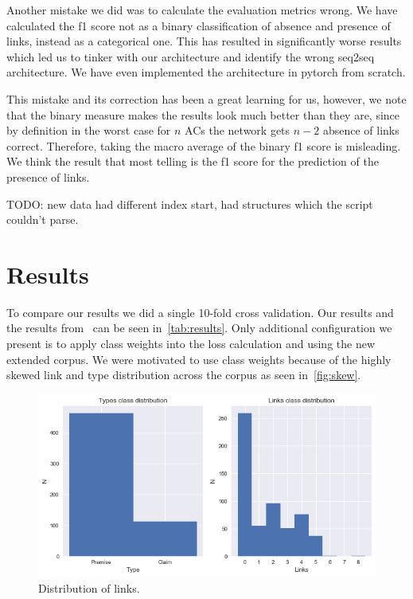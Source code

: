 \documentclass[onecolumn]{article}
\begin{document}
Another mistake we did was to calculate the evaluation metrics wrong.
We have calculated the f1 score not as a binary classification of absence and presence of links, instead as a categorical one.
This has resulted in significantly worse results which led us to tinker with our architecture and identify the wrong seq2seq architecture. We have even implemented the architecture in pytorch from scratch.

This mistake and its correction has been a great learning for us, however, we note that the binary measure makes the results look much better than they are,
since by definition in the worst case for $n$ ACs the network gets $n-2$ absence of links correct. Therefore, taking the macro average of the binary f1 score is misleading. We think the result that most telling is the f1 score for the prediction of the presence of links.

TODO: new data had different index start, had structures which the script couldn't parse.

\section{Results}
To compare our results we did a single 10-fold cross validation. Our results and the results from~\cite{potash2017here} can be seen in~\autoref{tab:results}.
Only additional configuration we present is to apply class weights into the loss calculation and using the new extended corpus.
We were motivated to use class weights because of the highly skewed link and type distribution across the corpus as seen in~\autoref{fig:skew}.

\begin{figure}[h]
    \centering
    \includegraphics[width=0.4\linewidth]{fig/dist.png}
    \caption{Distribution of links.}\label{fig:skew}
\end{figure}
\end{document}
